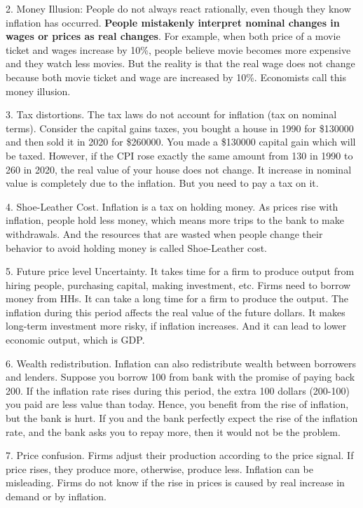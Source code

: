 \documentclass[12pt]{article}
\begin{document}
2. Money Illusion: People do not always react rationally, even though they know 
inflation has occurred. {\textbf {People mistakenly interpret nominal changes in 
wages or prices as real changes}}. For example, when both price of a movie ticket and
wages increase by 10\%, people believe movie becomes more expensive and they 
watch less movies. But the reality is that the real wage does not change because 
both movie ticket and wage are increased by 10\%. Economists call this money illusion.

3. Tax distortions. The tax laws do not account for inflation (tax on nominal terms).
Consider the capital gains taxes, you bought a house in 1990 for \$130000 and then
sold it in 2020 for \$260000. You made a \$130000 capital gain which will be taxed.
However, if the CPI rose exactly the same amount from 130 in 1990 to 260 in 2020, 
the real value of your house does not change. It increase in nominal value is 
completely due to the inflation. But you need to pay a tax on it. 

4. Shoe-Leather Cost. Inflation is a tax on holding money. As prices rise with 
inflation, people hold less money, which means more trips to the bank to make
withdrawals. And the resources that are wasted when people change their behavior to
avoid holding money is called Shoe-Leather cost.

5. Future price level Uncertainty. It takes time for a firm to produce output from
hiring people, purchasing capital, making investment, etc. Firms need to borrow money
from HHs. It can take a long time for a firm to produce the output. The inflation 
during this period affects the real value of the future dollars. It makes long-term
investment more risky, if inflation increases. And it can lead to lower economic 
output, which is GDP.

6. Wealth redistribution. Inflation can also redistribute wealth between borrowers and
lenders. Suppose you borrow 100 from bank with the promise of paying back 200. If the
inflation rate rises during this period, the extra 100 dollars (200-100) you paid are
less value than today. Hence, you benefit from the rise of inflation, but the bank
is hurt. If you and the bank perfectly expect the rise of the inflation rate, and
the bank asks you to repay more, then it would not be the problem. 

7. Price confusion. Firms adjust their production according to the price signal. If
price rises, they produce more, otherwise, produce less. Inflation can be misleading.
Firms do not know if the rise in prices is caused by real increase in demand or 
by inflation.
\end{document}
